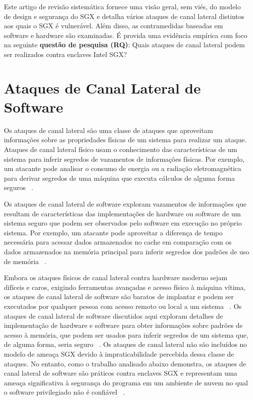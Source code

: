 \documentclass[review]{elsarticle}
\begin{document}
Este artigo de revisão sistemática fornece uma visão geral, sem viés, do modelo de design e segurança do SGX e detalha vários ataques de canal lateral distintos aos quais o SGX é vulnerável. Além disso, as contramedidas baseadas em software e hardware são examinadas. É provida uma evidência empírica com foco na seguinte \textbf{questão de pesquisa (RQ)}: Quais ataques de canal lateral podem ser realizados contra enclaves Intel SGX?

\section{Ataques de Canal Lateral de Software}

Os ataques de canal lateral são uma classe de ataques que aproveitam informações sobre as propriedades físicas de um sistema para realizar um ataque. Ataques de canal lateral físico usam o conhecimento das características de um sistema para inferir segredos de vazamentos de informações físicas. Por exemplo, um atacante pode analisar o consumo de energia ou a radiação eletromagnética para derivar segredos de uma máquina que executa cálculos de alguma forma seguros ~\cite{standaert_introduction_2010}.

Os ataques de canal lateral de software exploram vazamentos de informações que resultam de características das implementações de hardware ou software de um sistema seguro que podem ser observados pelo software em execução no próprio sistema. Por exemplo, um atacante pode aproveitar a diferença de tempo necessária para acessar dados armazenados no cache em comparação com os dados armazenados na memória principal para inferir segredos dos padrões de uso de memória ~\cite{costan_intel_2016}.

Embora os ataques físicos de canal lateral contra hardware moderno sejam difíceis e caros, exigindo ferramentas avançadas e acesso físico à máquina vítima, os ataques de canal lateral de software são baratos de implantar e podem ser executados por qualquer pessoa com acesso remoto ou local a um sistema ~\cite{costan_intel_2016}. Os ataques de canal lateral de software discutidos aqui exploram detalhes de implementação de hardware e software para obter informações sobre padrões de acesso à memória, que podem ser usados para inferir segredos de um sistema que, de alguma forma, seria seguro ~\cite{gotzfried_cache_2017, schwarz_malware_2017, xu_controlled-channel_2015, shinde_preventing_2015}. Os ataques de canal lateral não são incluídos no modelo de ameaça SGX devido à impraticabilidade percebida dessa classe de ataques. No entanto, como o trabalho analisado abaixo demonstra, os ataques de canal lateral de software são práticos contra enclaves SGX e representam uma ameaça significativa à segurança do programa em um ambiente de nuvem no qual o software privilegiado não é confiável ~\cite{moghimi_cachezoom:_2017, intel_corporation_tutorial_2015}.
\end{document}
